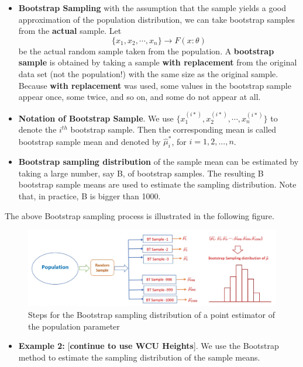 \documentclass[
]{book}
\providecommand{\tightlist}{%
  \setlength{\itemsep}{0pt}\setlength{\parskip}{0pt}}
\begin{document}
\begin{itemize}
\item
  \textbf{Bootstrap Sampling} with the assumption that the sample yields a good approximation of the population distribution, we can take bootstrap samples from the \textbf{actual} sample. Let
  \[\{x_1, x_2, \cdots, x_n\} \to F(x:\theta)\] be the actual random sample taken from the population. A \textbf{bootstrap sample} is obtained by taking a sample \textbf{with replacement} from the original data set (not the population!) with the same size as the original sample. Because \textbf{with replacement} was used, some values in the bootstrap sample appear once, some twice, and so on, and some do not appear at all.
\item
  \textbf{Notation of Bootstrap Sample}. We use \(\{x_1^{(i*)}, x_2^{(i*)}, \cdots, x_n^{(i*)}\}\) to denote the \(i^{th}\) bootstrap sample. Then the corresponding mean is called bootstrap sample mean and denoted by \(\hat{\mu}_i^*\), for \(i = 1, 2, ..., n\).
\item
  \textbf{Bootstrap sampling distribution} of the sample mean can be estimated by taking a large number, say B, of bootstrap samples. The resulting B bootstrap sample means are used to estimate the sampling distribution. Note that, in practice, B is bigger than 1000.
\end{itemize}

The above Bootstrap sampling process is illustrated in the following figure.

\begin{figure}

{\centering \includegraphics[width=0.95\linewidth]{img02/w02-BootSamplingDist} 

}

\caption{Steps for the Bootstrap sampling distribution of a point estimator of the population parameter}\label{fig:unnamed-chunk-55}
\end{figure}

\begin{itemize}
\tightlist
\item
  \textbf{Example 2:} {[}\textbf{continue to use WCU Heights}{]}. We use the Bootstrap method to estimate the sampling distribution of the sample means.
\end{itemize}
\end{document}
